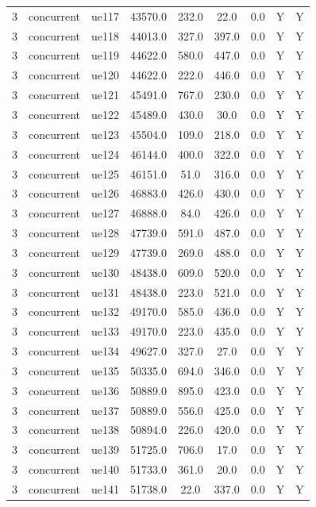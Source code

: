 \begin{table}[ht]
\begin{tabular}{|c|c|c|c|c|c|c|c|c|}
3 & concurrent & ue117 & 43570.0 & 232.0 & 22.0 & 0.0 & Y & Y \\
3 & concurrent & ue118 & 44013.0 & 327.0 & 397.0 & 0.0 & Y & Y \\
3 & concurrent & ue119 & 44622.0 & 580.0 & 447.0 & 0.0 & Y & Y \\
3 & concurrent & ue120 & 44622.0 & 222.0 & 446.0 & 0.0 & Y & Y \\
3 & concurrent & ue121 & 45491.0 & 767.0 & 230.0 & 0.0 & Y & Y \\
3 & concurrent & ue122 & 45489.0 & 430.0 & 30.0 & 0.0 & Y & Y \\
3 & concurrent & ue123 & 45504.0 & 109.0 & 218.0 & 0.0 & Y & Y \\
3 & concurrent & ue124 & 46144.0 & 400.0 & 322.0 & 0.0 & Y & Y \\
3 & concurrent & ue125 & 46151.0 & 51.0 & 316.0 & 0.0 & Y & Y \\
3 & concurrent & ue126 & 46883.0 & 426.0 & 430.0 & 0.0 & Y & Y \\
3 & concurrent & ue127 & 46888.0 & 84.0 & 426.0 & 0.0 & Y & Y \\
3 & concurrent & ue128 & 47739.0 & 591.0 & 487.0 & 0.0 & Y & Y \\
3 & concurrent & ue129 & 47739.0 & 269.0 & 488.0 & 0.0 & Y & Y \\
3 & concurrent & ue130 & 48438.0 & 609.0 & 520.0 & 0.0 & Y & Y \\
3 & concurrent & ue131 & 48438.0 & 223.0 & 521.0 & 0.0 & Y & Y \\
3 & concurrent & ue132 & 49170.0 & 585.0 & 436.0 & 0.0 & Y & Y \\
3 & concurrent & ue133 & 49170.0 & 223.0 & 435.0 & 0.0 & Y & Y \\
3 & concurrent & ue134 & 49627.0 & 327.0 & 27.0 & 0.0 & Y & Y \\
3 & concurrent & ue135 & 50335.0 & 694.0 & 346.0 & 0.0 & Y & Y \\
3 & concurrent & ue136 & 50889.0 & 895.0 & 423.0 & 0.0 & Y & Y \\
3 & concurrent & ue137 & 50889.0 & 556.0 & 425.0 & 0.0 & Y & Y \\
3 & concurrent & ue138 & 50894.0 & 226.0 & 420.0 & 0.0 & Y & Y \\
3 & concurrent & ue139 & 51725.0 & 706.0 & 17.0 & 0.0 & Y & Y \\
3 & concurrent & ue140 & 51733.0 & 361.0 & 20.0 & 0.0 & Y & Y \\
3 & concurrent & ue141 & 51738.0 & 22.0 & 337.0 & 0.0 & Y & Y \\

\end{tabular}
\end{table}
